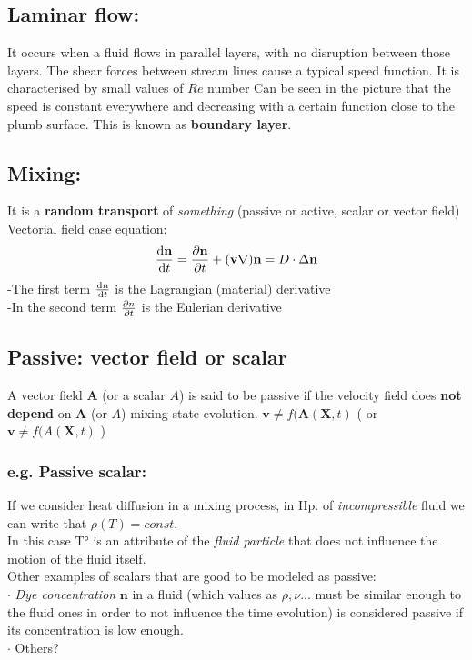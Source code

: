 \documentclass[a4paper,11pt]{article}
\begin{document}
\subsection{Laminar flow:}
 It occurs when a fluid flows in parallel layers, with no disruption between those layers.
 The shear forces between stream lines cause a typical speed function. 
 It is characterised by small values of $Re$ number
 Can be seen in the picture that the speed is constant everywhere and decreasing with a certain function close to the plumb surface. 
 This is known as \textbf{boundary layer}.

\subsection{Mixing:}
It is a \textbf{random transport} of \emph{something} (passive or active, scalar or vector field) \\ %
Vectorial field case equation:
\[ \dv{\mathbf{n}}{t} =\pdv{\mathbf{n}}{t}+(\mathbf{v} \nabla)\mathbf{n} = D \cdot \Delta \mathbf{n} \]
-The first term $\dv{n}{t}$ is the Lagrangian (material) derivative \\
-In the second term $\pdv{n}{t}$ is the Eulerian derivative

 
\subsection{Passive: vector field or scalar}
 A vector field $\mathbf{A}$ (or a scalar $A$) is said to be passive if the velocity field does \textbf{not depend} on $\mathbf{A}$ (or $A$) mixing state evolution.
 $ \mathbf{v} \neq f(\mathbf{A}(\mathbf{X},t) $  ( or $ \mathbf{v} \neq f(A(\mathbf{X},t) $ )
	\subsubsection{e.g. Passive scalar:}
If we consider heat diffusion in a mixing process, in Hp. of \emph{incompressible} fluid we can write that  $ \rho(T)=const. $ \\
In this case T° is an attribute of the \emph{fluid particle} that does not influence the motion of the fluid itself. \\
Other examples of scalars that are good to be modeled as passive: \\
$\cdot$ \emph{Dye concentration} $\mathbf{n}$ in a fluid (which values as $\rho , \nu ...$ must be similar enough to the fluid ones in order to not influence the time evolution) is considered passive if its concentration is low enough. \\
$\cdot$ Others? %
\end{document}
